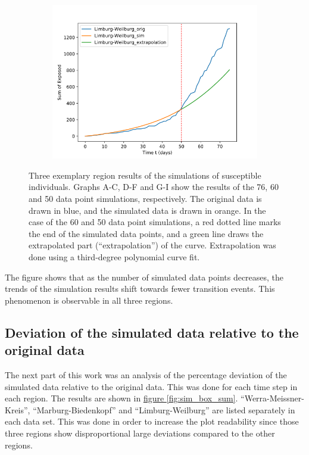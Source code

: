 \begin{figure}[h]
\begin{subfigure}[b]{0.3\textwidth}
		\includegraphics[width=\textwidth]{./figures/50d/10_Limburg-Weilburg.png}	
		\caption{}
	\end{subfigure}
	\caption[Simulation resutsl for susceptibles as graphs]{Three exemplary region results of the simulations of susceptible individuals. Graphs A-C, D-F and G-I
		show the results of the 76, 60 and 50 data point simulations, respectively.
		The original data is drawn in blue, and the simulated data is drawn in orange. In the case
		of the 60 and 50 data point simulations, a red dotted line marks the end of the simulated data points,
		and a green line draws the extrapolated part (``extrapolation'') of the curve.
		Extrapolation was done using a third-degree polynomial curve fit.
		}
	\label{fig:76_sim_expl}
\end{figure}

The figure shows that as the number of simulated data points decreases, the trends of the simulation results shift towards
fewer transition events. This phenomenon is observable in all three regions.



\subsection{Deviation of the simulated data relative to the original data}
The next part of this work was an analysis of the percentage deviation of the simulated data relative to the original data. This was done
for each time step in each region. The results are shown in \hyperref[fig:sim_box_sum]{figure \ref*{fig:sim_box_sum}}.
``Werra-Meissner-Kreis'', ``Marburg-Biedenkopf'' and ``Limburg-Weilburg'' are listed separately in each data set.
This was done in order to increase the plot readability since those three regions show disproportional large deviations compared
to the other regions.\newline

